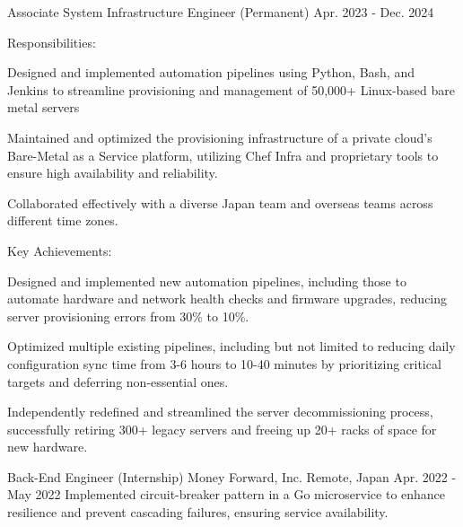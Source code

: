\begin{cventries}
  \cventry
    {Associate System Infrastructure Engineer (Permanent)} %
    {} %
    {} %
    {Apr. 2023 - Dec. 2024} %
    {
        Responsibilities:
        \begin{cvbullets}
        \item Designed and implemented automation pipelines using Python, Bash, and Jenkins
        to streamline provisioning and management of 50,000+ Linux-based bare metal servers
        \item Maintained and optimized the provisioning infrastructure of
        a private cloud's Bare-Metal as a Service platform,
        utilizing Chef Infra and proprietary tools to ensure high availability and reliability.
        \item Collaborated effectively with a diverse Japan team and overseas teams across
        different time zones.
        \end{cvbullets}
        Key Achievements:
        \begin{cvbullets}
        \item Designed and implemented new automation pipelines,
        including those to automate hardware and network health checks and firmware upgrades,
        reducing server provisioning errors from 30\% to 10\%.
        \item Optimized multiple existing pipelines,
        including but not limited to reducing daily configuration sync time from 3-6 hours to 10-40 minutes
        by prioritizing critical targets and deferring non-essential ones.
        \item Independently redefined and streamlined the server decommissioning process,
        successfully retiring 300+ legacy servers and freeing up 20+ racks of space for new hardware.
        \end{cvbullets}
    }

  \cventry
    {Back-End Engineer (Internship)} %
    {Money Forward, Inc.} %
    {Remote, Japan} %
    {Apr. 2022 - May 2022} %
    {
        Implemented circuit-breaker pattern in a Go microservice to enhance resilience and prevent cascading failures, ensuring service availability.
    }



\end{cventries}
